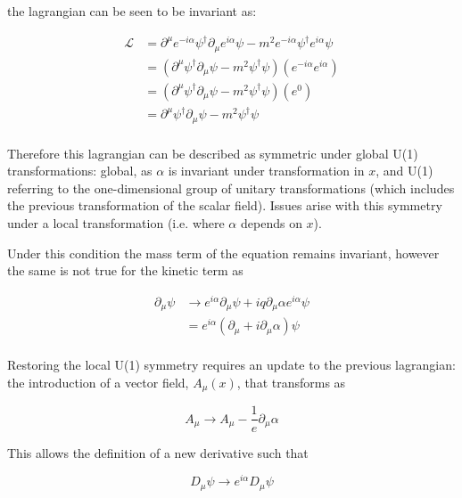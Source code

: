 \documentclass[12pt,a4paper,epsf,portrait,times,epsfig]{report}
\begin{document}
	the lagrangian can be seen to be invariant as:

	\begin{equation}
		\begin{split}
		\mathcal{L} &= \partial^{\mu}  e^{-i\alpha} \psi^{\dagger} \partial_{\mu} e^{i\alpha} \psi  - m^{2}e^{-i\alpha} \psi^{\dagger} e^{i\alpha}\psi  \\
		&= (\partial^{\mu} \psi^{\dagger} \partial_{\mu} \psi - m^{2}\psi^{\dagger}\psi)(e^{-i\alpha}e^{i\alpha}) \\ 
		&= (\partial^{\mu} \psi^{\dagger} \partial_{\mu} \psi - m^{2}\psi^{\dagger}\psi)(e^{0}) \\
		&= \partial^{\mu} \psi^{\dagger} \partial_{\mu} \psi - m^{2}\psi^{\dagger}\psi \\
		\end{split}
	\end{equation}

	Therefore this lagrangian can be described as symmetric under global U(1) transformations: global, as $\alpha$ is invariant under transformation in $x$, and U(1) referring to the one-dimensional group of unitary transformations (which includes the previous transformation of the scalar field). Issues arise with this symmetry under a local transformation (i.e. where $\alpha$ depends on $x$). 

	Under this condition the mass term of the equation remains invariant, however the same is not true for the kinetic term as

	\begin{equation}
		\begin{split}
		\partial_{\mu}\psi &\rightarrow e^{i\alpha}\partial_{\mu}\psi+iq\partial_{\mu}\alpha e^{i\alpha}\psi \\
		&= e^{i\alpha}(\partial_{\mu}+i\partial_{\mu}\alpha)\psi \\
		\end{split}
	\end{equation}

	Restoring the local U(1) symmetry requires an update to the previous lagrangian: the introduction of a vector field, $A_{\mu}(x)$, that transforms as 
	
	\begin{equation}
		A_{\mu} \rightarrow A_{\mu} - \frac{1}{e} \partial_{\mu} \alpha
	\end{equation}

	This allows the definition of a new derivative such that

	\begin{equation}
		D_{\mu}\psi \rightarrow e^{i\alpha}D_{\mu}\psi
	\end{equation}
\end{document}

